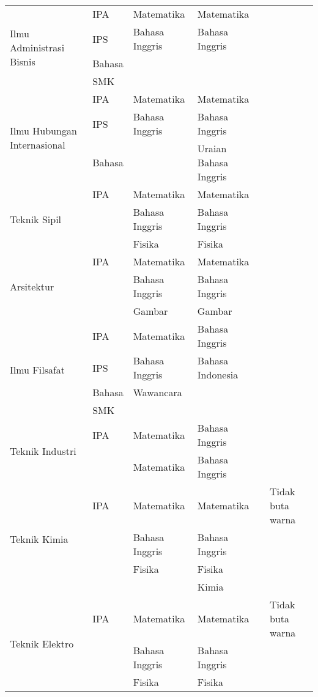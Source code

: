 \begin{longtable}[H]{|p{3cm}|p{2cm}|p{3cm}|p{3cm}|p{3cm}|}
		\hline
		\multirow{4}{10em}{Ilmu Administrasi Bisnis} & IPA & Matematika & Matematika & \\
		& IPS & Bahasa Inggris & Bahasa Inggris & \\
		& Bahasa & & & \\
		& SMK & & & \\
		
		\hline
		\multirow{3}{10em}{Ilmu Hubungan Internasional} & IPA & Matematika & Matematika & \\
		& IPS & Bahasa Inggris & Bahasa Inggris & \\
		& Bahasa & & Uraian Bahasa Inggris & \\
		
		\hline
		\multirow{3}{10em}{Teknik Sipil} & IPA & Matematika & Matematika & \\
		& & Bahasa Inggris & Bahasa Inggris & \\
		& & Fisika & Fisika & \\
		
		\hline
		\multirow{3}{10em}{Arsitektur} & IPA & Matematika & Matematika & \\
		& & Bahasa Inggris & Bahasa Inggris & \\
		& & Gambar & Gambar & \\
		
		\hline
		\multirow{4}{10em}{Ilmu Filsafat} & IPA & Matematika & Bahasa Inggris & \\
		& IPS & Bahasa Inggris & Bahasa Indonesia & \\
		& Bahasa & Wawancara & & \\
		& SMK & & & \\
		
		\hline
		\multirow{2}{10em}{Teknik Industri} & IPA & Matematika & Bahasa Inggris & \\
		& & Matematika & Bahasa Inggris & \\
		
		\hline
		\multirow{4}{10em}{Teknik Kimia} & IPA & Matematika & Matematika & Tidak buta warna\\
		& & Bahasa Inggris & Bahasa Inggris & \\
		& & Fisika & Fisika & \\
		& & & Kimia & \\
		
		\hline
		\multirow{3}{10em}{Teknik Elektro} & IPA & Matematika & Matematika & Tidak buta warna \\
		& & Bahasa Inggris & Bahasa Inggris & \\
		& & Fisika & Fisika & \\
		

\end{longtable}
